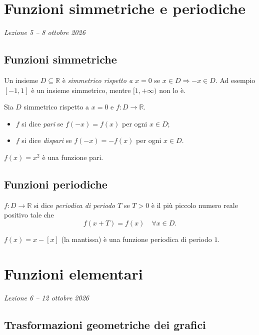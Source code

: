 \documentclass[11pt,a4paper]{article}
\begin{document}
\section[Funzioni simmetriche e periodiche (Lezione 5 -- 8 ottobre 2026)]{Funzioni simmetriche e periodiche}
\noindent\emph{Lezione 5 -- 8 ottobre 2026}
\subsection{Funzioni simmetriche}

Un insieme $D \subseteq \mathbb{R}$ è \emph{simmetrico rispetto a $x = 0$} se $x \in D \Rightarrow -x \in D$. Ad esempio $[-1, 1]$ è un insieme simmetrico, mentre $[1, +\infty)$ non lo è.

\begin{definizione}
Sia $D$ simmetrico rispetto a $x = 0$ e $f : D \to \mathbb{R}$.
\begin{itemize}
    \item $f$ si dice \emph{pari} se $f(-x) = f(x)$ per ogni $x \in D$;
    \item $f$ si dice \emph{dispari} se $f(-x) = -f(x)$ per ogni $x \in D$.
\end{itemize}
\end{definizione}

\begin{esempio}
$f(x) = x^2$ è una funzione pari.
\end{esempio}

\subsection{Funzioni periodiche}

\begin{definizione}
$f : D \to \mathbb{R}$ si dice \emph{periodica di periodo $T$} se $T > 0$ è il più piccolo numero reale positivo tale che
\[
f(x + T) = f(x) \quad \forall x \in D.
\]
\end{definizione}

\begin{esempio}
$f(x) = x - [x]$ (la mantissa) è una funzione periodica di periodo $1$.
\end{esempio}

\section[Funzioni elementari (Lezione 6 -- 12 ottobre 2026)]{Funzioni elementari}
\noindent\emph{Lezione 6 -- 12 ottobre 2026}
\subsection{Trasformazioni geometriche dei grafici}
\end{document}
